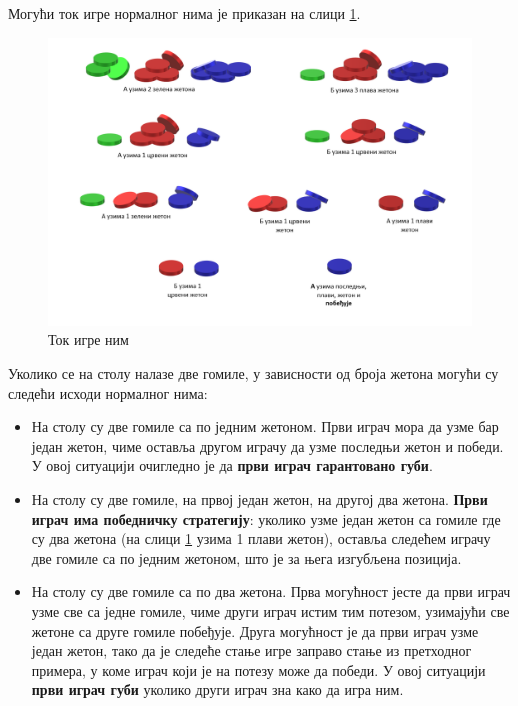 \documentclass[a4paper]{article}
\begin{document}
Могући ток игре нормалног нима је приказан на слици \ref{fig:nimPrimer}.

\begin{figure}[H]
	\begin{center}
		\includegraphics[width=\textwidth]{NimPrimer.png}
	\end{center}
	\caption{Ток игре ним}
	\label{fig:nimPrimer}
\end{figure}

Уколико се на столу налазе две гомиле, у зависности од броја жетона могући су следећи исходи нормалног нима:

\begin{itemize}
	\item На столу су две гомиле са по једним жетоном. Први играч мора да узме бар један жетон, чиме оставља другом играчу да узме последњи жетон и победи. У овој ситуацији очигледно је да \textbf{први играч гарантовано губи}.
	
	\item На столу су две гомиле, на првој један жетон, на другој два жетона. \textbf{Први играч има победничку стратегију}: уколико узме један жетон са гомиле где су два жетона (на слици \ref{fig:nimPrimer} узима 1 плави жетон), оставља следећем играчу две гомиле са по једним жетоном, што је за њега изгубљена позиција.
	
	\item На столу су две гомиле са по два жетона. Прва могућност јесте да први играч узме све са једне гомиле, чиме други играч истим тим потезом, узимајући све жетоне са друге гомиле побеђује. Друга могућност је да први играч узме један жетон, тако да је следеће стање игре заправо стање из претходног примера, у коме играч који је на потезу може да победи. У овој ситуацији \textbf{први играч губи} уколико други играч зна како да игра ним.
\end{itemize}
\end{document}
